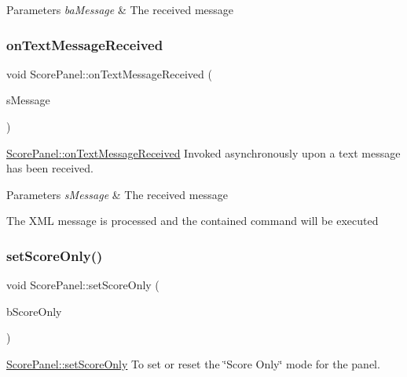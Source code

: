 \begin{DoxyParams}{Parameters}
{\em ba\+Message} & The received message \\
\hline
\end{DoxyParams}
\mbox{\label{classScorePanel_af3d7aa48c21c4e63d398dac5a2266130}} 
\subsubsection{\texorpdfstring{on\+Text\+Message\+Received}{onTextMessageReceived}}
{\footnotesize\ttfamily void Score\+Panel\+::on\+Text\+Message\+Received (\begin{DoxyParamCaption}\item[{Q\+String}]{s\+Message }\end{DoxyParamCaption})\hspace{0.3cm}{\ttfamily [slot]}}



\mbox{\hyperlink{classScorePanel_af3d7aa48c21c4e63d398dac5a2266130}{Score\+Panel\+::on\+Text\+Message\+Received}} Invoked asynchronously upon a text message has been received. 


\begin{DoxyParams}{Parameters}
{\em s\+Message} & The received message\\
\hline
\end{DoxyParams}
The X\+ML message is processed and the contained command will be executed \mbox{\label{classScorePanel_a0573b55e1bd67e61ac88361262440923}} 
\subsubsection{\texorpdfstring{set\+Score\+Only()}{setScoreOnly()}}
{\footnotesize\ttfamily void Score\+Panel\+::set\+Score\+Only (\begin{DoxyParamCaption}\item[{bool}]{b\+Score\+Only }\end{DoxyParamCaption})}



\mbox{\hyperlink{classScorePanel_a0573b55e1bd67e61ac88361262440923}{Score\+Panel\+::set\+Score\+Only}} To set or reset the \char`\"{}\+Score Only\char`\"{} mode for the panel. 


